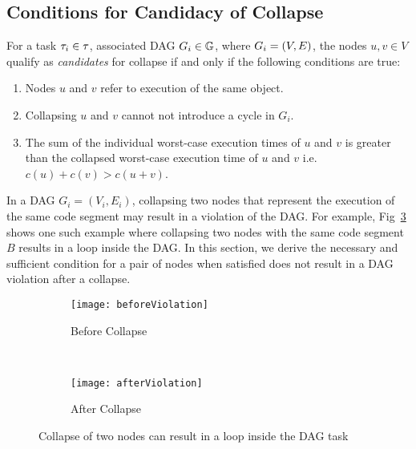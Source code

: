 \subsection{Conditions for Candidacy of Collapse}
For a task ${\tau_{i} \in \tau{}}$, associated DAG ${\Dag{i}
  \in \dagset{}}$, where ${\Dag{i} = (V, E)}$,
the nodes ${u,v \in V}$ qualify as \emph{candidates} for collapse if
and only if the following conditions are true:
\begin{enumerate}
  \item Nodes ${u}$ and ${v}$ refer to execution of the same object.
  \item Collapsing ${u}$ and ${v}$ cannot not introduce a cycle in ${G_i}$.
  \item The sum of the individual worst-case execution times of ${u}$
    and ${v}$ is greater than the collapsed worst-case execution time
    of ${u}$ and ${v}$ i.e. ${c(u) + c(v) > c(u + v)}$.
\end{enumerate}

In a DAG ${G_i = (V_i, E_i)}$, collapsing two nodes that represent the
execution of the same code segment may result in a violation of the
DAG. For example, Fig~\ref{fig:dag-violation} shows one such example
where collapsing two nodes with the same code segment $B$ results in a
loop inside the DAG. In this section, we derive the necessary and
sufficient condition for a pair of nodes when satisfied does not
result in a DAG violation after a collapse.


\begin{figure}
  \centering
  \begin{subfigure}[b]{0.48\textwidth}{
      \texttt{[image: beforeViolation]}
      \caption{Before Collapse}
      \label{fig:beforeViolation}
    }
  \end{subfigure}~
  \begin{subfigure}[b]{0.33\textwidth}{
      \texttt{[image: afterViolation]}
      \caption{After Collapse}
      \label{fig:afterViolation}
    }
  \end{subfigure}
  \caption{Collapse of two nodes can result in a loop inside the DAG task}
  \label{fig:dag-violation}
\end{figure}

